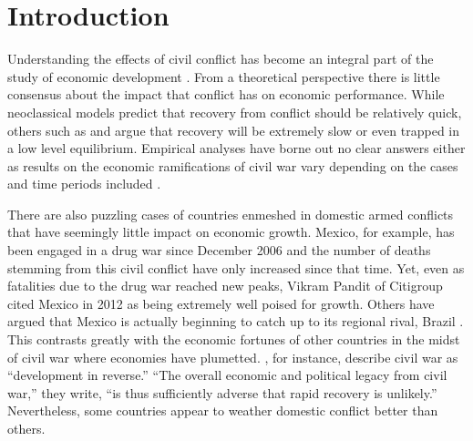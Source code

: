 \section{Introduction}
\label{intro}

Understanding the effects of civil conflict has become an integral part of the study of economic development \citep{serneels:verpoorten:2013}. From a theoretical perspective there is little consensus about the impact that conflict has on economic performance. While neoclassical models predict that recovery from conflict should be relatively quick, others such as \citet{barro:martin:2004} and \citet{sachs:2006} argue that recovery will be extremely slow or even trapped in a low level equilibrium. Empirical analyses have borne out no clear answers either as results on the economic ramifications of civil war vary depending on the cases and time periods included \citep{kang:meernik:2005}. 

There are also puzzling cases of countries enmeshed in domestic armed conflicts that have seemingly little impact on economic growth. Mexico, for example, has been engaged in a drug war since December 2006 and the number of deaths stemming from this civil conflict have only increased since that time. Yet, even as fatalities due to the drug war reached new peaks, Vikram Pandit of Citigroup cited Mexico in 2012 as being extremely well poised for growth. Others have argued that Mexico is actually beginning to catch up to its regional rival, Brazil \citep{vardi:2012}. This contrasts greatly with the economic fortunes of other countries in the midst of civil war where economies have plumetted. \cite{collier:elliott:etal:2003}, for instance, describe civil war as ``development in reverse.''  ``The overall economic and political legacy from civil war,'' they write, ``is thus sufficiently adverse that rapid recovery is unlikely.''  Nevertheless, some countries appear to weather domestic conflict better than others.  




